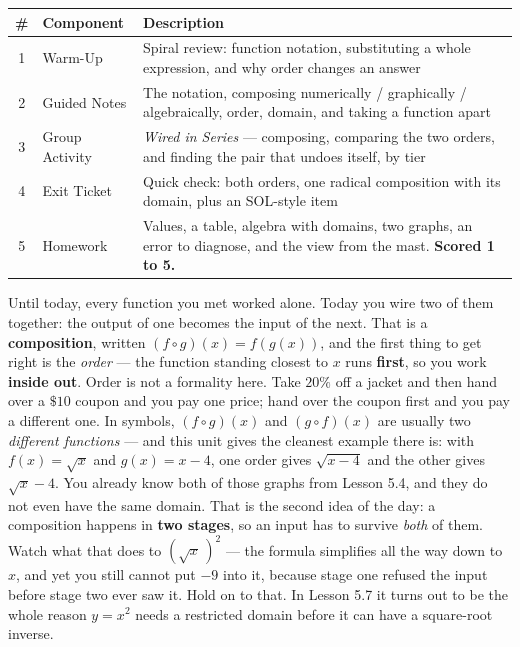 \documentclass[10pt]{article}
\begin{document}
\begin{tocbox}
\small
\renewcommand{\arraystretch}{1.5}
\begin{tabularx}{\linewidth}{@{} c l X @{}}
\rowcolor{forestbg}
\textbf{\#} & \textbf{Component} & \textbf{Description} \\
\midrule
1 & Warm-Up        & Spiral review: function notation, substituting a whole expression, and why order changes an answer \\
2 & Guided Notes   & The notation, composing numerically / graphically / algebraically, order, domain, and taking a function apart \\
3 & Group Activity & \emph{Wired in Series} --- composing, comparing the two orders, and finding the pair that undoes itself, by tier \\
4 & Exit Ticket    & Quick check: both orders, one radical composition with its domain, plus an SOL-style item \\
5 & Homework       & Values, a table, algebra with domains, two graphs, an error to diagnose, and the view from the mast. \textbf{Scored 1 to 5.} \\
\end{tabularx}
\end{tocbox}

\vspace{0.10in}

\begin{remindbox}
\small Until today, every function you met worked alone. Today you wire two of them together: the
output of one becomes the input of the next. That is a \textbf{composition}, written
$(f\circ g)(x)=f(g(x))$, and the first thing to get right is the \emph{order} --- the function
standing closest to $x$ runs \textbf{first}, so you work \textbf{inside out}. Order is not a
formality here. Take $20\%$ off a jacket and then hand over a $\$10$ coupon and you pay one price;
hand over the coupon first and you pay a different one. In symbols, $(f\circ g)(x)$ and
$(g\circ f)(x)$ are usually two \emph{different functions} --- and this unit gives the cleanest
example there is: with $f(x)=\sqrt{x}$ and $g(x)=x-4$, one order gives $\sqrt{x-4}$ and the other
gives $\sqrt{x}-4$. You already know both of those graphs from Lesson 5.4, and they do not even have
the same domain. That is the second idea of the day: a composition happens in \textbf{two stages},
so an input has to survive \emph{both} of them. Watch what that does to
$\left(\sqrt{x}\,\right)^{2}$ --- the formula simplifies all the way down to $x$, and yet you still
cannot put $-9$ into it, because stage one refused the input before stage two ever saw it. Hold on
to that. In Lesson 5.7 it turns out to be the whole reason $y=x^{2}$ needs a restricted domain
before it can have a square-root inverse.
\end{remindbox}
\end{document}
